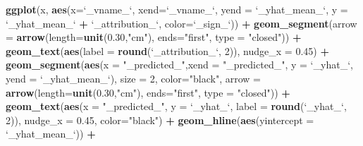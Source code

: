 \documentclass[12pt,]{krantz}
\newenvironment{Shaded}{\begin{snugshade}}{\end{snugshade}}
\newcommand{\DataTypeTok}[1]{\textcolor[rgb]{0.13,0.29,0.53}{#1}}
\newcommand{\DecValTok}[1]{\textcolor[rgb]{0.00,0.00,0.81}{#1}}
\newcommand{\FloatTok}[1]{\textcolor[rgb]{0.00,0.00,0.81}{#1}}
\newcommand{\KeywordTok}[1]{\textcolor[rgb]{0.13,0.29,0.53}{\textbf{#1}}}
\newcommand{\NormalTok}[1]{#1}
\newcommand{\OperatorTok}[1]{\textcolor[rgb]{0.81,0.36,0.00}{\textbf{#1}}}
\newcommand{\StringTok}[1]{\textcolor[rgb]{0.31,0.60,0.02}{#1}}
\theoremstyle{definition}
\theoremstyle{definition}
\theoremstyle{definition}
\theoremstyle{remark}
\begin{document}
\begin{Shaded}
\begin{Highlighting}[]
\KeywordTok{ggplot}\NormalTok{(x, }\KeywordTok{aes}\NormalTok{(}\DataTypeTok{x=}\StringTok{`}\DataTypeTok{_vname_}\StringTok{`}\NormalTok{, }\DataTypeTok{xend=}\StringTok{`}\DataTypeTok{_vname_}\StringTok{`}\NormalTok{, }
              \DataTypeTok{yend =} \StringTok{`}\DataTypeTok{_yhat_mean_}\StringTok{`}\NormalTok{, }\DataTypeTok{y =} \StringTok{`}\DataTypeTok{_yhat_mean_}\StringTok{`} \OperatorTok{+}\StringTok{ `}\DataTypeTok{_attribution_}\StringTok{`}\NormalTok{, }
              \DataTypeTok{color=}\StringTok{`}\DataTypeTok{_sign_}\StringTok{`}\NormalTok{)) }\OperatorTok{+}
\StringTok{  }\KeywordTok{geom_segment}\NormalTok{(}\DataTypeTok{arrow =} \KeywordTok{arrow}\NormalTok{(}\DataTypeTok{length=}\KeywordTok{unit}\NormalTok{(}\FloatTok{0.30}\NormalTok{,}\StringTok{"cm"}\NormalTok{), }\DataTypeTok{ends=}\StringTok{"first"}\NormalTok{, }\DataTypeTok{type =} \StringTok{"closed"}\NormalTok{)) }\OperatorTok{+}\StringTok{ }
\StringTok{  }\KeywordTok{geom_text}\NormalTok{(}\KeywordTok{aes}\NormalTok{(}\DataTypeTok{label =} \KeywordTok{round}\NormalTok{(}\StringTok{`}\DataTypeTok{_attribution_}\StringTok{`}\NormalTok{, }\DecValTok{2}\NormalTok{)), }\DataTypeTok{nudge_x =} \FloatTok{0.45}\NormalTok{) }\OperatorTok{+}
\StringTok{  }\KeywordTok{geom_segment}\NormalTok{(}\KeywordTok{aes}\NormalTok{(}\DataTypeTok{x =} \StringTok{"_predicted_"}\NormalTok{,}\DataTypeTok{xend =} \StringTok{"_predicted_"}\NormalTok{,}
                   \DataTypeTok{y =} \StringTok{`}\DataTypeTok{_yhat_}\StringTok{`}\NormalTok{, }\DataTypeTok{yend =} \StringTok{`}\DataTypeTok{_yhat_mean_}\StringTok{`}\NormalTok{), }\DataTypeTok{size =} \DecValTok{2}\NormalTok{, }\DataTypeTok{color=}\StringTok{"black"}\NormalTok{,}
               \DataTypeTok{arrow =} \KeywordTok{arrow}\NormalTok{(}\DataTypeTok{length=}\KeywordTok{unit}\NormalTok{(}\FloatTok{0.30}\NormalTok{,}\StringTok{"cm"}\NormalTok{), }\DataTypeTok{ends=}\StringTok{"first"}\NormalTok{, }\DataTypeTok{type =} \StringTok{"closed"}\NormalTok{)) }\OperatorTok{+}\StringTok{ }
\StringTok{  }\KeywordTok{geom_text}\NormalTok{(}\KeywordTok{aes}\NormalTok{(}\DataTypeTok{x =} \StringTok{"_predicted_"}\NormalTok{, }
                \DataTypeTok{y =} \StringTok{`}\DataTypeTok{_yhat_}\StringTok{`}\NormalTok{, }\DataTypeTok{label =} \KeywordTok{round}\NormalTok{(}\StringTok{`}\DataTypeTok{_yhat_}\StringTok{`}\NormalTok{, }\DecValTok{2}\NormalTok{)), }\DataTypeTok{nudge_x =} \FloatTok{0.45}\NormalTok{, }\DataTypeTok{color=}\StringTok{"black"}\NormalTok{) }\OperatorTok{+}
\StringTok{  }\KeywordTok{geom_hline}\NormalTok{(}\KeywordTok{aes}\NormalTok{(}\DataTypeTok{yintercept =} \StringTok{`}\DataTypeTok{_yhat_mean_}\StringTok{`}\NormalTok{)) }\OperatorTok{+}\StringTok{ }

\end{Highlighting}
\end{Shaded}
\end{document}
